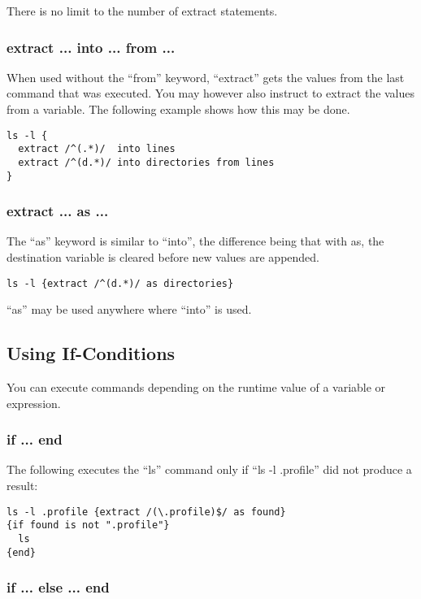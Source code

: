 There is no limit to the number of extract statements. 


\subsubsection{extract ... into ... from ...}

When used without the ``from'' keyword, ``extract'' gets the values from the 
last command that was executed. You may however also instruct \product to 
extract the values from a variable. The following example shows how this 
may be done. 

\begin{lstlisting}
ls -l {
  extract /^(.*)/  into lines
  extract /^(d.*)/ into directories from lines
}
\end{lstlisting}


\subsubsection{extract ... as ...}

The ``as'' keyword is similar to ``into'', the difference being that with 
as, the destination variable is cleared before new values are appended. 

\begin{lstlisting}
ls -l {extract /^(d.*)/ as directories}
\end{lstlisting}

``as'' may be used anywhere where ``into'' is used.


\subsection{Using If-Conditions}

You can execute commands depending on the runtime value of a variable or 
expression. 

\subsubsection{if ... end}

The following \product executes the ``ls'' command only if ``ls -l .profile'' 
did not produce a result: 

\begin{lstlisting}
ls -l .profile {extract /(\.profile)$/ as found}
{if found is not ".profile"}
  ls
{end}
\end{lstlisting}


\subsubsection{if ... else ... end}


